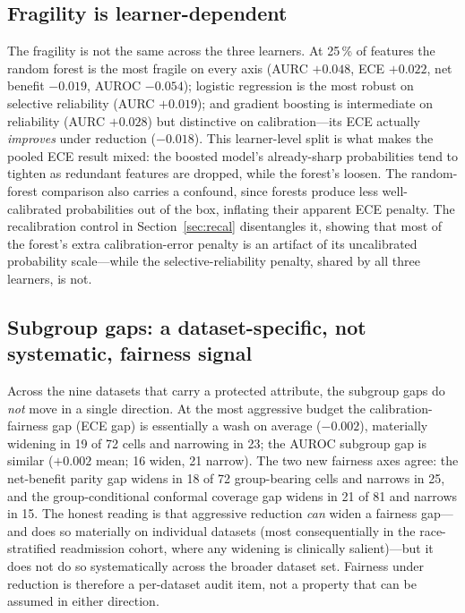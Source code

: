 \documentclass[fleqn,10pt]{wlscirep}
\newcommand{\result}[1]{#1}
\begin{document}
\subsection{Fragility is learner-dependent}
The fragility is not the same across the three learners. At 25\,\% of features the random forest is
the most fragile on every axis (AURC \result{$+0.048$}, ECE \result{$+0.022$}, net benefit
\result{$-0.019$}, AUROC \result{$-0.054$}); logistic regression is the most robust on selective
reliability (AURC \result{$+0.019$}); and gradient boosting is intermediate on reliability (AURC
\result{$+0.028$}) but distinctive on calibration---its ECE actually \emph{improves} under reduction
(\result{$-0.018$}). This learner-level split is what makes the pooled ECE result mixed: the boosted
model's already-sharp probabilities tend to tighten as redundant features are dropped, while the
forest's loosen. The random-forest comparison also carries a confound, since forests produce
less well-calibrated probabilities out of the box, inflating their apparent ECE penalty. The
recalibration control in Section~\ref{sec:recal} disentangles it, showing that most of the forest's
extra calibration-error penalty is an artifact of its uncalibrated probability scale---while the
selective-reliability penalty, shared by all three learners, is not.

\subsection{Subgroup gaps: a dataset-specific, not systematic, fairness signal}
Across the nine datasets that carry a protected attribute, the subgroup gaps do \emph{not} move in a
single direction. At the most aggressive budget the calibration-fairness gap (ECE gap) is essentially a
wash on average (\result{$-0.002$}), materially widening in \result{19} of \result{72} cells and
narrowing in \result{23}; the AUROC subgroup gap is similar (\result{$+0.002$} mean; \result{16}
widen, \result{21} narrow). The two new fairness axes agree: the net-benefit parity gap
\cite{pfohl2022net} widens in
\result{18} of \result{72} group-bearing cells and narrows in \result{25}, and the group-conditional
conformal coverage gap widens in \result{21} of \result{81} and narrows in \result{15}. The honest
reading is that aggressive reduction \emph{can} widen a fairness gap---and does so materially on
individual datasets (most consequentially in the race-stratified readmission cohort, where any widening
is clinically salient)---but it does not do so systematically across the broader dataset set. Fairness
under reduction is therefore a per-dataset audit item, not a property that can be assumed in either
direction.
\end{document}
